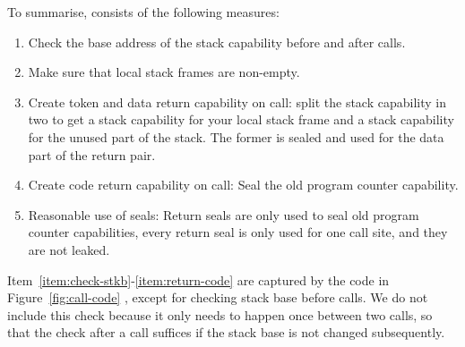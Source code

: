 \documentclass[acmsmall,screen]{acmart}\settopmatter{}
\begin{document}
To summarise, \stktokens{} consists of the following measures:
\begin{enumerate}
\item \label{item:check-stkb} Check the base address of the stack capability before and after calls.
\item \label{item:non-empty-sf} Make sure that local stack frames are non-empty.
\item \label{item:return-data} Create token and data return capability on call: split the stack capability in two to get a stack capability for your local stack frame and a stack capability for the unused part of the stack. The former is sealed and used for the data part of the return pair.
\item \label{item:return-code} Create code return capability on call: Seal the old program counter capability.
\item Reasonable use of seals: Return seals are only used to seal old program counter capabilities, every return seal is only used for one call site, and they are not leaked.
\end{enumerate}
Item~\ref{item:check-stkb}-\ref{item:return-code} are captured by the code in Figure~\ref{fig:call-code} , except for checking stack base before calls.
We do not include this check because it only needs to happen once between two calls, so that the check after a call suffices if the stack base is not changed subsequently.
\end{document}
